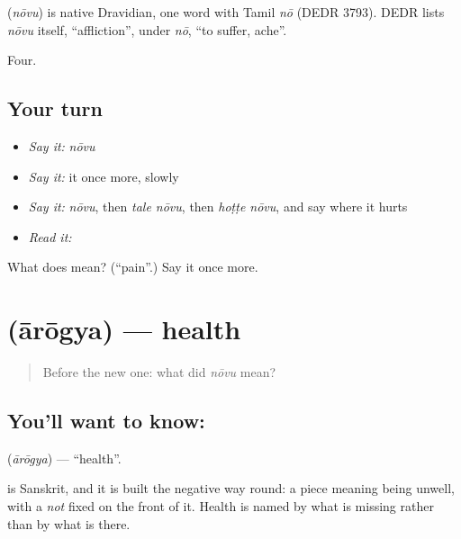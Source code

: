 \begin{cousinweb}
\textbf{} (\emph{nōvu}) is native Dravidian, one word with Tamil \emph{nō} (DEDR 3793). DEDR lists \emph{nōvu} itself, \textquotedblleft{}affliction\textquotedblright{}, under \emph{nō}, \textquotedblleft{}to suffer, ache\textquotedblright{}.
\end{cousinweb}

\begin{grammarlens}[title={What you've built}]
Four.
\end{grammarlens}

\subsection*{Your turn}
\begin{itemize}
\raggedright
  \item \emph{Say it:} \emph{nōvu}
  \item \emph{Say it:} it once more, slowly
  \item \emph{Say it:} \emph{nōvu}, then \emph{tale nōvu}, then \emph{hoṭṭe nōvu}, and say where it hurts
  \item \emph{Read it:} \textbf{}
\end{itemize}

\begin{tcolorbox}[breakable,colback=teal!4,colframe=teal!35!black,title={Before you move on}]
What does  mean? (\textquotedblleft{}pain\textquotedblright{}.) Say it once more.
\end{tcolorbox}
\section[\texorpdfstring{\kn{ಆರೋಗ್ಯ} (ārōgya)}{ಆರೋಗ್ಯ (ārōgya)}]{ (ārōgya) — health}

\label{lesson:KA-C63-health}



\begin{quote}
Before the new one: what did \emph{nōvu} mean?
\end{quote}

\subsection*{You'll want to know: }
\textbf{} (\emph{ārōgya}) — \textquotedblleft{}health\textquotedblright{}.

 is Sanskrit, and it is built the negative way round: a piece meaning being unwell, with a \emph{not} fixed on the front of it. Health is named by what is missing rather than by what is there.

